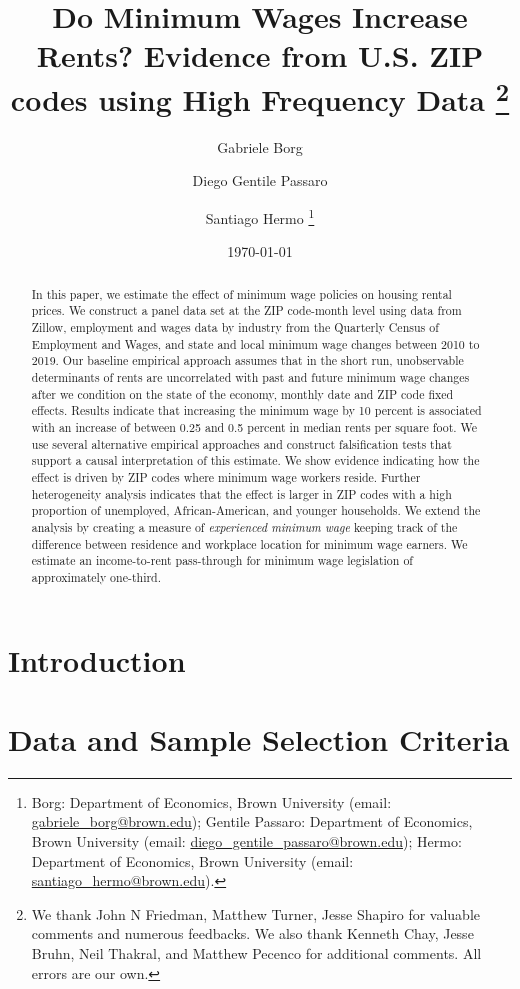 \documentclass{article}
\title{Do Minimum Wages Increase Rents? 
	   Evidence from U.S. ZIP codes using High Frequency Data 
	   \thanks{We thank John N Friedman, Matthew Turner, Jesse Shapiro for valuable comments and 
   numerous feedbacks. We also thank Kenneth Chay, Jesse Bruhn, Neil Thakral, and Matthew Pecenco for additional 
   comments. All errors are our own.}}
\author{Gabriele Borg \and Diego Gentile Passaro \and Santiago Hermo
		\footnote{Borg: Department of Economics, Brown University (email: 
		\url{gabriele_borg@brown.edu}); 
		Gentile Passaro: Department of Economics, Brown University (email: 
		\url{diego_gentile_passaro@brown.edu}); 
		Hermo: Department of Economics, Brown University (email: 
		\url{santiago_hermo@brown.edu}).}
		}
\date{\today}
\begin{document}
\maketitle

\begin{abstract}
    \noindent
    In this paper, we estimate the effect of minimum wage policies on housing rental 
    prices. We construct a panel data set at the ZIP code-month level using 
    data from Zillow, employment and wages data by industry  from the Quarterly Census of 
    Employment and Wages, and state and local minimum wage changes between 2010 to 2019. 
    Our baseline empirical approach assumes that in the short run, unobservable determinants of 
    rents are uncorrelated with past and future minimum wage changes after we condition on  
    the state of the economy, monthly date and ZIP code fixed effects.  Results indicate that increasing 
    the minimum wage by 10 percent is associated with an increase of between 0.25 and 0.5 percent in 
    median rents per square foot. We use several alternative empirical approaches and construct 
    falsification tests that support a causal interpretation of this estimate. We show 
    evidence indicating how the effect is driven by ZIP codes where minimum wage workers 
    reside. Further heterogeneity analysis indicates that the effect is larger in ZIP codes 
    with a high proportion of unemployed, African-American, and younger households. We 
    extend the analysis by creating a measure of \textit{experienced minimum wage} keeping track 
    of the difference between residence and workplace location for minimum wage earners. We 
    estimate an income-to-rent pass-through for minimum wage legislation of approximately one-third. 
\end{abstract}

\vspace{5mm}

\maketitle


\clearpage

\section{Introduction}\label{sec:intro}
    

\section{Data and Sample Selection Criteria}\label{sec:data}
	
\end{document}
